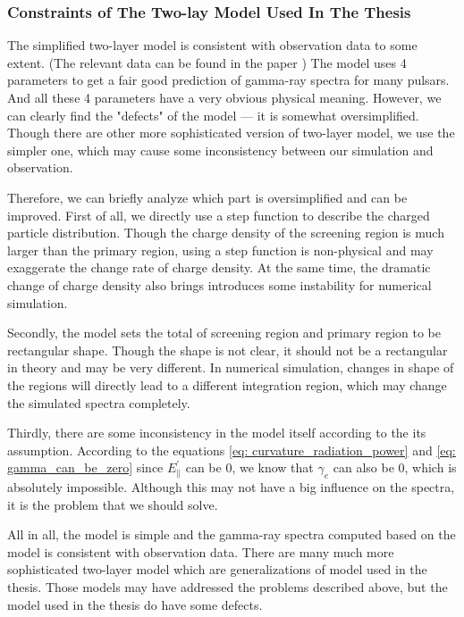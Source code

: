 \documentclass[12pt]{report}
\begin{document}
      \subsubsection{Constraints of The Two-lay Model Used In The Thesis} 
        The simplified two-layer model is consistent with observation data to some extent. 
        (The relevant data can be found in the paper \cite{0004-637X-720-1-178})
        The model uses 4 parameters to get a fair good prediction of gamma-ray spectra for many 
        pulsars. And all these 4 parameters have a very obvious physical meaning. 
        However, we can clearly find the "defects" of the model --- it is somewhat oversimplified. 
        Though there are other more sophisticated version of two-layer model, we use the simpler one, 
        which may cause some inconsistency between our simulation and observation. 

        Therefore, we can briefly analyze which part is oversimplified and can be improved. 
        First of all, we directly use a step function to describe the charged particle distribution. 
        Though the charge density of the screening region is much larger than the primary region, using 
        a step function is non-physical and may exaggerate the change rate of charge density. At the 
        same time, the dramatic change of charge density also brings introduces some instability for 
        numerical simulation. 

        Secondly, the model sets the total of screening region and primary region to be rectangular shape. 
        Though the shape is not clear, it should not be a rectangular in theory and may be very different.
        In numerical simulation, changes in shape of the regions will directly lead to a different 
        integration region, which may change the simulated spectra completely.

        Thirdly, there are some inconsistency in the model itself according to the its assumption. 
        According to the equations \ref{eq: curvature_radiation_power} and \ref{eq: gamma_can_be_zero}
        since $E_{\parallel}^{\prime}$ can be $0$, we know that 
        $\gamma_{e}$ can also be $0$, which is absolutely impossible. Although this may not have a big 
        influence on the spectra, it is the problem that we should solve. 

        All in all, the model is simple and the gamma-ray spectra computed based on the model is 
        consistent with observation data. There are many much more sophisticated two-layer model 
        which are generalizations of model used in the thesis. Those models may have addressed the 
        problems described above, but the model used in the thesis do have some defects. 
\end{document}
